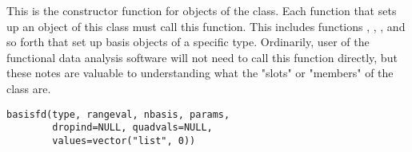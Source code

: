 \documentclass{article}
\begin{document}
\begin{Description}\relax
This is the constructor function for objects of the 
class.  Each function that sets up an object of this class must call
this function.  This includes functions ,
, , and so
forth that set up basis objects of a specific type.  Ordinarily, user
of the functional data analysis software will not need to call this
function directly, but these notes are valuable to understanding what
the "slots" or "members" of the  class are.
\end{Description}
\begin{Usage}
\begin{verbatim}
basisfd(type, rangeval, nbasis, params,
        dropind=NULL, quadvals=NULL,
        values=vector("list", 0))
\end{verbatim}
\end{Usage}
\end{document}
